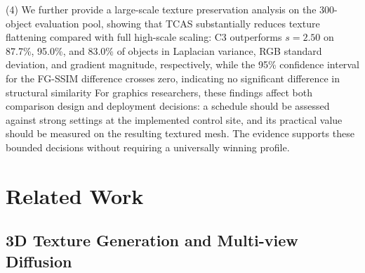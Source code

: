 \documentclass[times,twocolumn,final]{elsarticle}
\providecommand{\DIFadd}[1]{{\protect\color{blue} \sf #1}} %
\providecommand{\DIFdel}[1]{{\protect\color{red} \scriptsize #1}} %
\providecommand{\DIFaddbegin}{} %
\providecommand{\DIFaddend}{} %
\providecommand{\DIFdelbegin}{} %
\providecommand{\DIFdelend}{} %
\begin{document}
\DIFdelbegin \DIFdel{(4) We further provide a large-scale texture preservation analysis on the 300-object evaluation pool, showing that TCAS substantially reduces texture flattening compared with full high-scale scaling: C3 outperforms $s = 2.50$ on 87.7\%, 95.0\%, and 83.0\% of objects in Laplacian variance, RGB standard deviation, and gradient magnitude, respectively, while the 95\% confidence interval for the FG-SSIM difference crosses zero, indicating no significant difference in structural similarity}\DIFdelend \DIFaddbegin \DIFadd{For graphics researchers, these findings affect both comparison design and deployment decisions: a schedule should be assessed against strong settings at the implemented control site, and its practical value should be measured on the resulting textured mesh. The evidence supports these bounded decisions without requiring a universally winning profile}\DIFaddend .

\section{Related Work}
\label{sec:related}

\subsection{3D Texture Generation and Multi-view Diffusion}
\label{subsec:3dtex}
\end{document}
